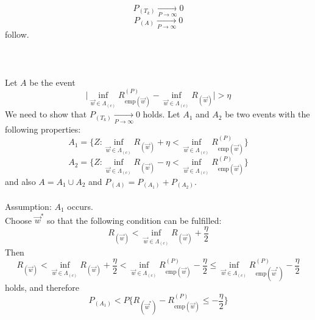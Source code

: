 \begin{equation} \label{7}
	P_{ (T_k) } \xrightarrow[P \rightarrow \infty]{} 0 
\end{equation}
\begin{equation}\label{8}
	P_{ (A) } \xrightarrow[P \rightarrow \infty]{} 0 
\end{equation}
follow.
\\\\
\\\\
Let $A$ be the event 
\begin{equation} \label{9}
	\Big| \inf_{ \vec{w} \in \Lambda_{ (c) } }
		R_{ \mathrm{emp}(\vec{w}) }^{(P)}
 		- \inf_{ \vec{w} \in \Lambda_{ (c) } }
		R_{ (\vec{w}) }
	\Big| > \eta
\end{equation}
We need to show that $P_{ (T_k) } \xrightarrow[P \rightarrow \infty]{} 0$ holds.
Let $A_1$ and $A_2$ be two events with the following properties:
\begin{equation} \label{10}
	A_1 = 	\Big\{ Z: \inf_{ \vec{w} \in \Lambda_{ (c) } } 
			R_{ (\vec{w}) } + \eta
		       < \inf_{ \vec{w} \in \Lambda_{ (c) } } 
			R_{ \mathrm{emp}(\vec{w}) }^{(P)}
		\Big\} 
\end{equation}
\begin{equation} \label{11}
	A_2 = 	\Big\{ Z: \inf_{ \vec{w} \in \Lambda_{ (c) } } 
			R_{ (\vec{w}) } - \eta
		       < \inf_{ \vec{w} \in \Lambda_{ (c) } } 
			R_{ \mathrm{emp}(\vec{w}) }^{(P)}
		\Big\} 
\end{equation}
and also $A = A_1 \cup A_2$ and  $P_{(A)} = P_{(A_1)} + P_{(A_2)}$. \\\\
Assumption: $A_1$ occurs.\\
Choose $\vec{w}^*$ so that the following condition can be fulfilled:
\begin{equation} \label{12}
	R_{ (\vec{w}) } < 
		\inf_{ \vec{w} \in \Lambda_{ (c) } } 
		R_{ (\vec{w}) } + \frac{\eta}{2}
\end{equation}
Then
\begin{equation} \label{13}
	R_{(\vec{w})} 
	< \inf_{\vec{w} \in \Lambda_{(c)}} R_{(\vec{w})} + \frac{\eta}{2}
	< \inf_{\vec{w} \in \Lambda_{(c)}} R_{\mathrm{emp}(\vec{w})}^{(P)} -
		\frac{\eta}{2}
	\leq \inf_{\vec{w} \in \Lambda_{(c)}} 
		R_{\mathrm{emp}(\vec{w}^*)}^{(P)} -
		\frac{\eta}{2}
\end{equation}
holds, and therefore
\begin{equation} \label{14}
	P_{(A_1)} < P\Big\{
		R_{(\vec{w}^*)}- R_{\mathrm{emp}(\vec{w})}^{(P)}
	\leq -\frac{\eta}{2} \Big\}
\end{equation}
